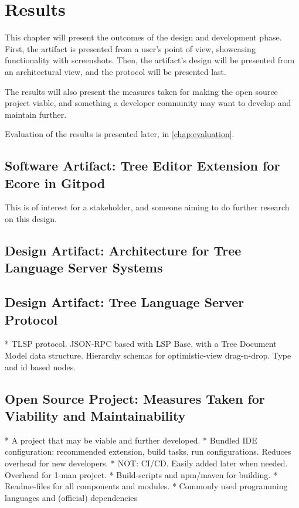 \chapter{Results}\label{chap:results}

This chapter will present the outcomes of the design and development phase.
First, the artifact is presented from a user's point of view, showcasing functionality with screenshots.
Then, the artifact's design will be presented from an architectural view, and the protocol will be presented last.


The results will also present the measures taken for making the \gls{open source} project viable, and something a developer community may want to develop and maintain further.

Evaluation of the results is presented later, in \cref{chap:evaluation}.

\section{Software Artifact: Tree Editor Extension for Ecore in Gitpod}

This is of interest for a stakeholder, and someone aiming to do further research on this design.




\section{Design Artifact: Architecture for Tree Language Server Systems}




\section{Design Artifact: Tree Language Server Protocol}\label{sec:tlsp}



* TLSP protocol. JSON-RPC based with LSP Base, with a Tree Document Model data structure. Hierarchy schemas for optimistic-view drag-n-drop. Type and id based nodes. 


\section{Open Source Project: Measures Taken for Viability and Maintainability}

* A project that may be viable and further developed.
  * Bundled IDE configuration: recommended extension, build tasks, run configurations. Reduces overhead for new developers.
  * NOT: CI/CD. Easily added later when needed. Overhead for 1-man project.
  * Build-scripts and npm/maven for building.
  * Readme-files for all components and modules.
  * Commonly used programming languages and (official) dependencies
  

